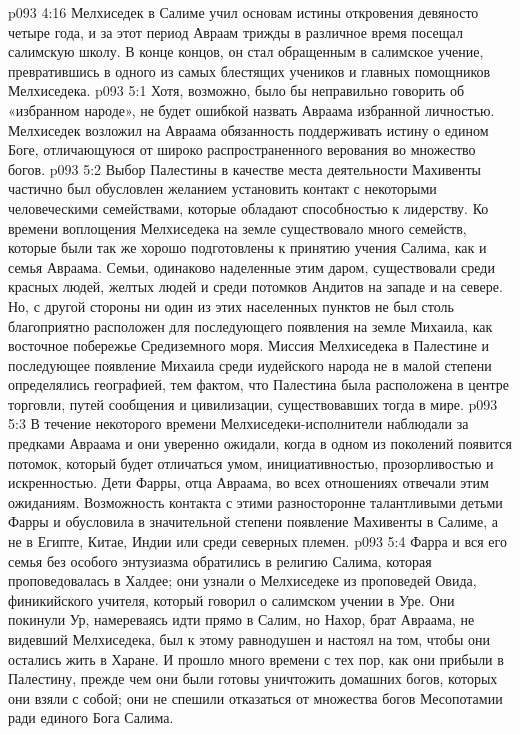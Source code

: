 \vs p093 4:16 \pc Мелхиседек в Салиме учил основам истины откровения девяносто четыре года, и за этот период Авраам трижды в различное время посещал салимскую школу. В конце концов, он стал обращенным в салимское учение, превратившись в одного из самых блестящих учеников и главных помощников Мелхиседека.
\vs p093 5:1 Хотя, возможно, было бы неправильно говорить об «избранном народе», не будет ошибкой назвать Авраама избранной личностью. Мелхиседек возложил на Авраама обязанность поддерживать истину о едином Боге, отличающуюся от широко распространенного верования во множество богов.
\vs p093 5:2 Выбор Палестины в качестве места деятельности Махивенты частично был обусловлен желанием установить контакт с некоторыми человеческими семействами, которые обладают способностью к лидерству. Ко времени воплощения Мелхиседека на земле существовало много семейств, которые были так же хорошо подготовлены к принятию учения Салима, как и семья Авраама. Семьи, одинаково наделенные этим даром, существовали среди красных людей, желтых людей и среди потомков Андитов на западе и на севере. Но, с другой стороны ни один из этих населенных пунктов не был столь благоприятно расположен для последующего появления на земле Михаила, как восточное побережье Средиземного моря. Миссия Мелхиседека в Палестине и последующее появление Михаила среди иудейского народа не в малой степени определялись географией, тем фактом, что Палестина была расположена в центре торговли, путей сообщения и цивилизации, существовавших тогда в мире.
\vs p093 5:3 В течение некоторого времени Мелхиседеки\hyp{}исполнители наблюдали за предками Авраама и они уверенно ожидали, когда в одном из поколений появится потомок, который будет отличаться умом, инициативностью, прозорливостью и искренностью. Дети Фарры, отца Авраама, во всех отношениях отвечали этим ожиданиям. Возможность контакта с этими разносторонне талантливыми детьми Фарры и обусловила в значительной степени появление Махивенты в Салиме, а не в Египте, Китае, Индии или среди северных племен.
\vs p093 5:4 Фарра и вся его семья без особого энтузиазма обратились в религию Салима, которая проповедовалась в Халдее; они узнали о Мелхиседеке из проповедей Овида, финикийского учителя, который говорил о салимском учении в Уре. Они покинули Ур, намереваясь идти прямо в Салим, но Нахор, брат Авраама, не видевший Мелхиседека, был к этому равнодушен и настоял на том, чтобы они остались жить в Харане. И прошло много времени с тех пор, как они прибыли в Палестину, прежде чем они были готовы уничтожить  домашних богов, которых они взяли с собой; они не спешили отказаться от множества богов Месопотамии ради единого Бога Салима.
